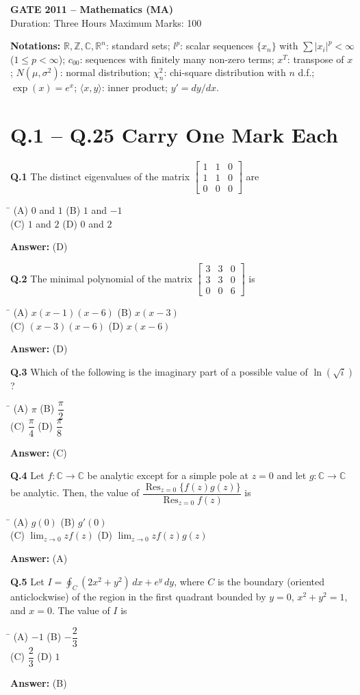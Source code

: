 \documentclass[11pt,a4paper]{article}
\newcommand{\optsfourA}[4]{%
  \begin{tabbing}
    \hspace{0.48\linewidth}\=\kill
    (A) #1 \> (B) #2 \\[2pt]
    (C) #3 \> (D) #4
  \end{tabbing}%
}
\newcommand{\ans}[1]{\textbf{Answer:} #1\par\medskip}
\begin{document}
\begin{center}
  {\Large\bfseries GATE 2011 -- Mathematics (MA)}\\[4pt]
  {\small Duration: Three Hours \quad\textbar\quad Maximum Marks: 100}
\end{center}

\medskip
\textbf{Notations:} $\mathbb{R}, \mathbb{Z}, \mathbb{C}, \mathbb{R}^n$: standard sets; $l^p$: scalar sequences $\{x_n\}$ with $\sum |x_i|^p < \infty$ ($1 \le p < \infty$); $c_{00}$: sequences with finitely many non-zero terms; $x^T$: transpose of $x$; $N(\mu, \sigma^2)$: normal distribution; $\chi_n^2$: chi-square distribution with $n$ d.f.; $\exp(x) = e^x$; $\langle x, y \rangle$: inner product; $y' = dy/dx$.

\section*{Q.1 -- Q.25 Carry One Mark Each}

\textbf{Q.1} The distinct eigenvalues of the matrix $\begin{bmatrix} 1 & 1 & 0 \\ 1 & 1 & 0 \\ 0 & 0 & 0 \end{bmatrix}$ are
\optsfourA{$0$ and $1$}{$1$ and $-1$}{$1$ and $2$}{$0$ and $2$}
\ans{(D)}

\textbf{Q.2} The minimal polynomial of the matrix $\begin{bmatrix} 3 & 3 & 0 \\ 3 & 3 & 0 \\ 0 & 0 & 6 \end{bmatrix}$ is
\optsfourA{$x(x - 1)(x - 6)$}{$x(x - 3)$}{$(x - 3)(x - 6)$}{$x(x - 6)$}
\ans{(D)}

\textbf{Q.3} Which of the following is the imaginary part of a possible value of $\ln(\sqrt{i})$?
\optsfourA{$\pi$}{$\dfrac{\pi}{2}$}{$\dfrac{\pi}{4}$}{$\dfrac{\pi}{8}$}
\ans{(C)}

\textbf{Q.4} Let $f : \mathbb{C} \to \mathbb{C}$ be analytic except for a simple pole at $z = 0$ and let $g : \mathbb{C} \to \mathbb{C}$ be analytic. Then, the value of $\dfrac{\operatorname{Res}_{z=0}\{f(z)g(z)\}}{\operatorname{Res}_{z=0} f(z)}$ is
\optsfourA{$g(0)$}{$g'(0)$}{$\lim_{z\to 0} z f(z)$}{$\lim_{z\to 0} z f(z) g(z)$}
\ans{(A)}

\textbf{Q.5} Let $I = \displaystyle\oint_C (2x^2 + y^2)\,dx + e^y\,dy$, where $C$ is the boundary (oriented anticlockwise) of the region in the first quadrant bounded by $y = 0$, $x^2 + y^2 = 1$, and $x = 0$. The value of $I$ is
\optsfourA{$-1$}{$-\dfrac{2}{3}$}{$\dfrac{2}{3}$}{$1$}
\ans{(B)}
\end{document}
